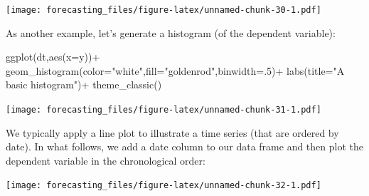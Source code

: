 \documentclass[
  12pt,
  oneside]{book}
\newenvironment{Shaded}{\begin{snugshade}}{\end{snugshade}}
\newcommand{\AttributeTok}[1]{\textcolor[rgb]{0.77,0.63,0.00}{#1}}
\newcommand{\DecValTok}[1]{\textcolor[rgb]{0.00,0.00,0.81}{#1}}
\newcommand{\FunctionTok}[1]{\textcolor[rgb]{0.00,0.00,0.00}{#1}}
\newcommand{\NormalTok}[1]{#1}
\newcommand{\OtherTok}[1]{\textcolor[rgb]{0.56,0.35,0.01}{#1}}
\newcommand{\SpecialCharTok}[1]{\textcolor[rgb]{0.00,0.00,0.00}{#1}}
\newcommand{\StringTok}[1]{\textcolor[rgb]{0.31,0.60,0.02}{#1}}
\begin{document}
\texttt{[image: forecasting\_files/figure-latex/unnamed-chunk-30-1.pdf]}

As another example, let's generate a histogram (of the dependent variable):

\begin{Shaded}
\begin{Highlighting}[]
\FunctionTok{ggplot}\NormalTok{(dt,}\FunctionTok{aes}\NormalTok{(}\AttributeTok{x=}\NormalTok{y))}\SpecialCharTok{+}
  \FunctionTok{geom\_histogram}\NormalTok{(}\AttributeTok{color=}\StringTok{"white"}\NormalTok{,}\AttributeTok{fill=}\StringTok{"goldenrod"}\NormalTok{,}\AttributeTok{binwidth=}\NormalTok{.}\DecValTok{5}\NormalTok{)}\SpecialCharTok{+}
  \FunctionTok{labs}\NormalTok{(}\AttributeTok{title=}\StringTok{"A basic histogram"}\NormalTok{)}\SpecialCharTok{+}
  \FunctionTok{theme\_classic}\NormalTok{()}
\end{Highlighting}
\end{Shaded}

\texttt{[image: forecasting\_files/figure-latex/unnamed-chunk-31-1.pdf]}

We typically apply a line plot to illustrate a time series (that are ordered by date). In what follows, we add a date column to our data frame and then plot the dependent variable in the chronological order:

\begin{Shaded}
\end{Shaded}

\texttt{[image: forecasting\_files/figure-latex/unnamed-chunk-32-1.pdf]}
\end{document}
